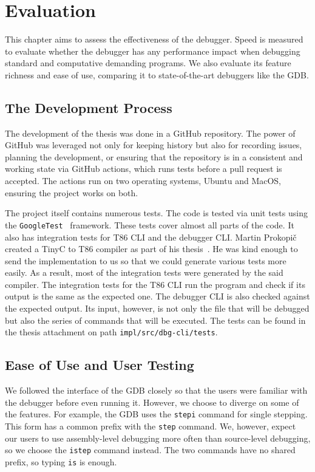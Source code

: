 \chapter{Evaluation}
This chapter aims to assess the effectiveness of the debugger. Speed is
measured to evaluate whether the debugger has any performance impact when
debugging standard and computative demanding programs. We also evaluate its
feature richness and ease of use, comparing it to state-of-the-art debuggers
like the GDB.

\section{The Development Process}
The development of the thesis was done in a GitHub repository. The power of
GitHub was leveraged not only for keeping history but also for recording
issues, planning the development, or ensuring that the repository is in a
consistent and working state via GitHub actions, which runs tests before a pull
request is accepted. The actions run on two operating systems, Ubuntu and
MacOS, ensuring the project works on both.

The project itself contains numerous tests. The code is tested via unit tests
using the \texttt{GoogleTest}~\cite{gtest} framework. These tests cover almost
all parts of the code. It also has integration tests for T86 CLI and the
debugger CLI. Martin Prokopič created a TinyC to T86 compiler as part of his
thesis~\cite{martintinyc}. He was kind enough to send the implementation to us
so that we could generate various tests more easily. As a result, most of the
integration tests were generated by the said compiler. The integration tests
for the T86 CLI run the program and check if its output is the same as the
expected one. The debugger CLI is also checked against the expected output. Its
input, however, is not only the file that will be debugged but also the series
of commands that will be executed. The tests can be found in the thesis
attachment on path \texttt{impl/src/dbg-cli/tests}.

\section{Ease of Use and User Testing}
We followed the interface of the GDB closely so that the users were familiar
with the debugger before even running it. However, we choose to diverge on some
of the features. For example, the GDB uses the \texttt{stepi} command for
single stepping. This form has a common prefix with the \texttt{step} command.
We, however, expect our users to use assembly-level debugging more often than
source-level debugging, so we choose the \texttt{istep} command instead. The
two commands have no shared prefix, so typing \texttt{is} is enough.

